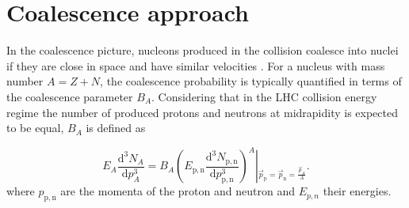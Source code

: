 \section{Coalescence approach} \label{sec:coalescence}

In the coalescence picture, nucleons produced in the collision coalesce into nuclei if they are close in space and have similar velocities \cite{Butler:1963,Kapusta:1980}. 
For a nucleus with mass number $A = Z + N$, the coalescence probability is typically quantified in terms of the coalescence parameter $B_{A}$.
Considering that in the LHC collision energy regime the number of produced protons and neutrons at midrapidity is expected to be equal,  $B_{A}$ is defined as

\begin{equation}
E_{A}\frac{\mathrm{d}^{3}N_{A}}{\mathrm{d}p_{A}^{3}}=B_{A}{\left(E_{\mathrm{p,n}}\frac{\mathrm{d}^{3}N_{\mathrm{p,n}}}{\mathrm{d}p_{\mathrm{p,n}}^{3}}\right)^{A}}\left\vert_{\vec{p}_{\mathrm{p}}=\vec{p}_{\mathrm{n}}=\frac{\vec{p}_{A}}{A}} \right..
\label{eq:BA}
\end{equation}
%
where $p_{\mathrm{p,n}}$ are the momenta of the proton and neutron and $E_{p,n}$ their energies.

